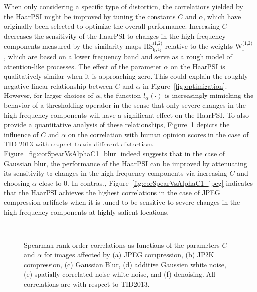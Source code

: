 \documentclass[11pt,a4paper]{article}
\begin{document}
When only considering a specific type of distortion, the correlations yielded by the HaarPSI might be improved by tuning the constants $C$ and $\alpha$, which have originally been selected to optimize the overall performance. Increasing $C$ decreases the sensitivity of the HaarPSI to changes in the high-frequency components measured by the similarity maps $\operatorname{HS^\text{(1,2)}_{f_1,f_2}}$ relative to the weights $\operatorname{W^\text{(1,2)}_{f}}$, which are based on a lower frequency band and serve as a rough model of attention-like processes. The effect of the parameter $\alpha$ on the HaarPSI is qualitatively similar when it is approaching zero. This could explain the roughly negative linear relationship between $C$ and $\alpha$ in Figure~\ref{fig:optimization}. However, for larger choices of $\alpha$, the function $l_\alpha(\cdot)$ is increasingly mimicking the behavior of a thresholding operator in the sense that only severe changes in the high-frequency components will have a significant effect on the HaarPSI. To also provide a quantitative analysis of these relationships, Figure~\ref{fig:corSpearVsAlphaC1} depicts the influence of $C$ and $\alpha$ on the correlation with human opinion scores in the case of TID 2013 with respect to six different distortions. Figure~\ref{fig:corSpearVsAlphaC1_blur} indeed suggests that in the case of Gaussian blur, the performance of the HaarPSI can be improved by attenuating its sensitivity to changes in the high-frequency components via increasing $C$ and choosing $\alpha$ close to 0. In contrast, Figure~\ref{fig:corSpearVsAlphaC1_jpeg} indicates that the HaarPSI achieves the highest correlations in the case of JPEG compression artifacts when it is tuned to be sensitive to severe changes in the high frequency components at highly salient locations.
	


\begin{figure}[!htb]
	\centering
	\hfil
	\hfil
	\\
	\hfil
	\hfil
	\hfil
\caption{Spearman rank order correlations as functions of the parameters $C$ and
		$\alpha$ for images affected by (a) JPEG compression, (b) JP2K compression, (c)
			Gaussian Blur, (d) additive Gaussien white
			noise, (e) spatially correlated noise white
			noise, and (f) denoising. All correlations are with respect to TID2013.}
	\label{fig:corSpearVsAlphaC1}
\end{figure}
\end{document}

